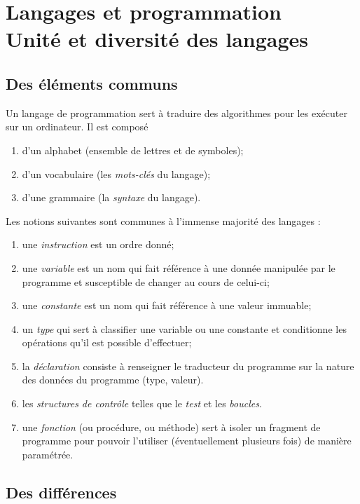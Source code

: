 \documentclass[a4paper,12pt,french]{book}
\begin{document}
\chapter*{\large Langages et programmation\\[-1em]\fontsize{35pt}{42pt}\selectfont\titlefont Unité et diversité des langages}

\section*{Des éléments communs}
Un langage de programmation sert à traduire des algorithmes pour les exécuter sur un ordinateur. Il est composé 
\begin{enumerate}[\textbullet]
	\item 	d'un alphabet (ensemble de lettres et de symboles);
	\item 	d'un vocabulaire (les \textit{mots-clés} du langage);
	\item 	d'une grammaire (la \textit{syntaxe} du langage).
\end{enumerate}

Les notions suivantes sont communes à l'immense majorité des langages :

\begin{enumerate}[\textbullet]
	\item 	une \textit{instruction} est un ordre donné;
	\item 	une \textit{variable} est un nom qui fait référence à une donnée manipulée par le programme et susceptible de changer au cours de celui-ci;
	\item 	une \textit{constante} est un nom qui fait référence à une valeur immuable;
	\item 	un \textit{type} qui sert à classifier une variable ou une constante et conditionne les opérations qu'il est possible d'effectuer;
	\item 	la \textit{déclaration} consiste à renseigner le traducteur du programme sur la nature des données du programme (type, valeur).
	\item 	les \textit{structures de contrôle} telles que le \textit{test} et les \textit{boucles}.
	\item 	une \textit{fonction} (ou procédure, ou méthode) sert à isoler un fragment de programme pour pouvoir l'utiliser (éventuellement plusieurs fois) de manière paramétrée.
\end{enumerate}

\section*{Des différences}
\end{document}
